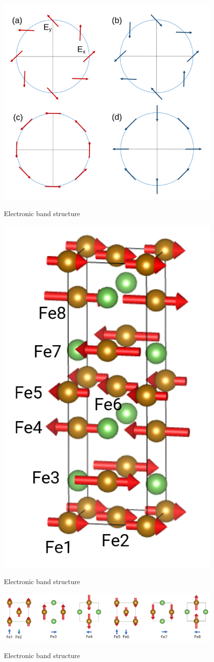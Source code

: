 \documentclass[11pt,edeposit,draftthesis]{uiucthesis2020}
\begin{document}
\begin{mainmatter}
\begin{figure}
\centering\includegraphics[width=0.7\columnwidth]{figures/ch2/rashba_dresselhaus.png} \\
\caption{\label{fig:rashba_dresselhaus}
Electronic band structure
}
\end{figure}

\begin{figure}
\centering\includegraphics[width=0.3\columnwidth]{figures/ch2/Fe2As.png} \\
\caption{\label{fig:Fe2As}
Electronic band structure
}
\end{figure}

\begin{figure}
\centering\includegraphics[width=\columnwidth]{figures/ch2/fieldlike_torque_Fe2As.png} \\
\caption{\label{fig:fieldlike_torque_Fe2As}
Electronic band structure
}
\end{figure}


\end{mainmatter}
\end{document}

